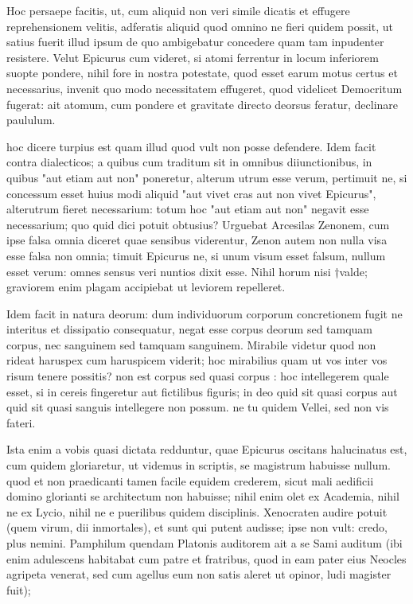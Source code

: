  Hoc persaepe facitis, ut, cum aliquid non veri simile dicatis et effugere reprehensionem velitis, adferatis aliquid quod omnino ne fieri quidem possit, ut satius fuerit illud ipsum de quo ambigebatur concedere quam tam inpudenter resistere. Velut Epicurus cum videret, si atomi ferrentur in locum inferiorem suopte pondere, nihil fore in nostra potestate, quod esset earum motus certus et necessarius, invenit quo modo necessitatem effugeret, quod videlicet Democritum fugerat: ait atomum, cum pondere et gravitate directo deorsus feratur, declinare paululum.

 hoc dicere turpius est quam illud quod vult non posse defendere. Idem facit contra dialecticos; a quibus cum traditum sit in omnibus diiunctionibus, in quibus "aut etiam aut non" poneretur, alterum utrum esse verum, pertimuit ne, si concessum esset huius modi aliquid "aut vivet cras aut non vivet Epicurus", alterutrum fieret necessarium: totum hoc "aut etiam aut non" negavit esse necessarium; quo quid dici potuit obtusius? Urguebat Arcesilas Zenonem, cum ipse falsa omnia diceret quae sensibus viderentur, Zenon autem non nulla visa esse falsa non omnia; timuit Epicurus ne, si unum visum esset falsum, nullum esset verum: omnes sensus veri nuntios dixit esse. Nihil horum nisi †valde; graviorem enim plagam accipiebat ut leviorem repelleret.

 Idem facit in natura deorum: dum individuorum corporum concretionem fugit ne interitus et dissipatio consequatur, negat esse corpus deorum sed tamquam corpus, nec sanguinem sed tamquam sanguinem. Mirabile videtur quod non rideat haruspex cum haruspicem viderit; hoc mirabilius quam ut vos inter vos risum tenere possitis? non est corpus sed quasi corpus : hoc intellegerem quale esset, si in cereis fingeretur aut fictilibus figuris; in deo quid sit quasi corpus aut quid sit quasi sanguis intellegere non possum. ne tu quidem Vellei, sed non vis fateri.

 Ista enim a vobis quasi dictata redduntur, quae Epicurus oscitans halucinatus est, cum quidem gloriaretur, ut videmus in scriptis, se magistrum habuisse nullum. quod et non praedicanti tamen facile equidem crederem, sicut mali aedificii domino glorianti se architectum non habuisse; nihil enim olet ex Academia, nihil ne ex Lycio, nihil ne e puerilibus quidem disciplinis. Xenocraten audire potuit (quem virum, dii inmortales), et sunt qui putent audisse; ipse non vult: credo, plus nemini. Pamphilum quendam Platonis auditorem ait a se Sami auditum (ibi enim adulescens habitabat cum patre et fratribus, quod in eam pater eius Neocles agripeta venerat, sed cum agellus eum non satis aleret ut opinor, ludi magister fuit);

